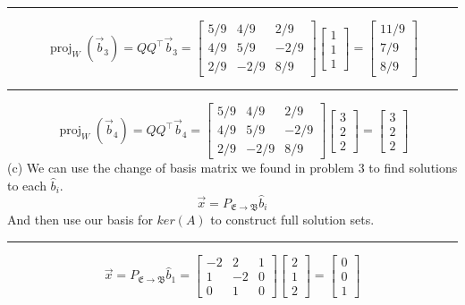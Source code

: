 \documentclass{report}
\begin{document}
\vspace{0.5em}
\hrule
\vspace{1em}
$$
\operatorname{proj}_W(\vec{b}_3) = QQ^\top\vec{b}_3 = \begin{bmatrix}
5/9&4/9&2/9\\
4/9&5/9&-2/9\\
2/9&-2/9&8/9
\end{bmatrix}\begin{bmatrix}1\\1\\1\end{bmatrix} = \begin{bmatrix}11/9\\7/9\\8/9\end{bmatrix}
$$
\vspace{0.5em}
\hrule
\vspace{1em}
$$
\operatorname{proj}_W(\vec{b}_4) = QQ^\top\vec{b}_4 = \begin{bmatrix}
5/9&4/9&2/9\\
4/9&5/9&-2/9\\
2/9&-2/9&8/9
\end{bmatrix}\begin{bmatrix}3\\2\\2\end{bmatrix} = \begin{bmatrix}3\\2\\2\end{bmatrix}
$$
(c) We can use the change of basis matrix we found in problem 3 to find solutions to each $\hat{b}_i$.
$$
\vec{x} = P_{\mathfrak{E}\rightarrow\mathfrak{B}}\hat{b}_i
$$
And then use our basis for $ker(A)$ to construct full solution sets.
\vspace{1em}
\hrule
\vspace{1em}
$$
\vec{x} = P_{\mathfrak{E}\rightarrow\mathfrak{B}}\hat{b}_1 = \begin{bmatrix}-2&2&1\\1&-2&0\\0&1&0\end{bmatrix}\begin{bmatrix}2\\1\\2\end{bmatrix} = \begin{bmatrix}0\\0\\1\end{bmatrix}
$$
\end{document}
